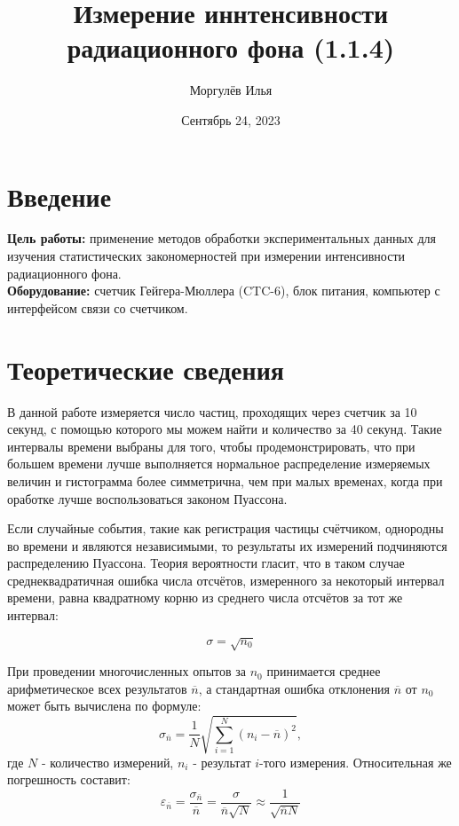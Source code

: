 \documentclass[a4paper, 12pt]{article}
\title{\textbf{Измерение иннтенсивности радиационного фона (1.1.4)}}
\author{Моргулёв Илья}
\date{Сентябрь 24, 2023}
\begin{document}
	
	\maketitle
	
	\section{Введение}
	
	\textbf{Цель работы:} применение методов обработки экспериментальных данных для изучения статистических закономерностей при измерении интенсивности радиационного фона.
	\bigskip\\
	\textbf{Оборудование:} счетчик Гейгера-Мюллера (CTC-6), блок питания, компьютер с интерфейсом связи со счетчиком.
	
	\section{Теоретические сведения}
	
	В данной работе измеряется число частиц, проходящих через счетчик за 10 секунд, с помощью которого мы можем найти и количество за 40 секунд. Такие интервалы времени выбраны для того, чтобы продемонстрировать, что при большем времени лучше выполняется нормальное распределение измеряемых величин и гистограмма более симметрична, чем при малых временах, когда при оработке лучше воспользоваться законом Пуассона.
	
	Если случайные события, такие как регистрация частицы счётчиком, однородны во времени и являются независимыми, то результаты их измерений подчиняются распределению Пуассона. Теория вероятности гласит, что в таком случае среднеквадратичная ошибка числа отсчётов, измеренного за некоторый интервал времени, равна квадратному корню из среднего числа отсчётов за тот же интервал:
	
	\begin{equation}
		\sigma = \sqrt{n_0}
	\end{equation}
	 
	
	При проведении многочисленных опытов за $n_0$ принимается среднее арифметическое всех результатов $\overline n$, а стандартная ошибка отклонения $\overline n$ от $n_0$ может быть вычислена по формуле:
	\[ \sigma_{\overline n} = \frac{1}{N} \sqrt{\sum_{i=1}^N(n_i - \overline n)^2}, \] где $N$ - количество измерений, $n_i$ - результат $i$-того измерения. Относительная же погрешность составит: \[\varepsilon_{\overline{n}} = \frac{\sigma_{\overline{n}}}{\overline{n}} = \frac{\sigma}{\overline{n} \sqrt{N}} \approx \frac{1}{\sqrt{\overline{n}N}} \] 
	
\end{document}
